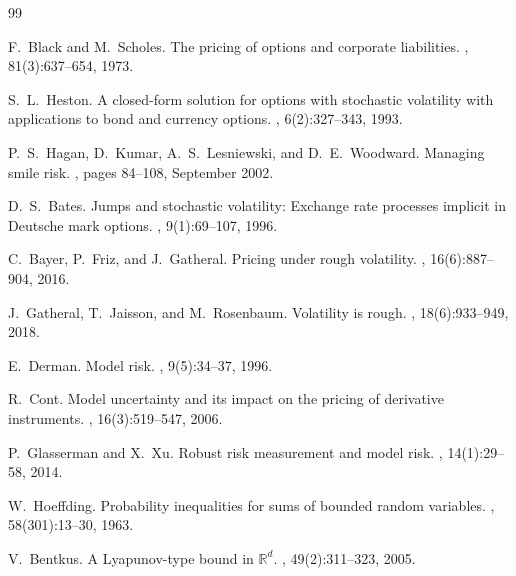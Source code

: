 \documentclass[11pt,a4paper]{article}
\theoremstyle{plain}
\theoremstyle{definition}
\theoremstyle{remark}
\newcommand{\R}{\mathbb{R}}
\begin{document}
\begin{thebibliography}{99}

F.~Black and M.~Scholes.
\newblock The pricing of options and corporate liabilities.
, 81(3):637--654, 1973.

S.~L.~Heston.
\newblock A closed-form solution for options with stochastic volatility with
  applications to bond and currency options.
, 6(2):327--343, 1993.

P.~S.~Hagan, D.~Kumar, A.~S.~Lesniewski, and D.~E.~Woodward.
\newblock Managing smile risk.
, pages 84--108, September 2002.

D.~S.~Bates.
\newblock Jumps and stochastic volatility: Exchange rate processes implicit in
  Deutsche mark options.
, 9(1):69--107, 1996.

C.~Bayer, P.~Friz, and J.~Gatheral.
\newblock Pricing under rough volatility.
, 16(6):887--904, 2016.

J.~Gatheral, T.~Jaisson, and M.~Rosenbaum.
\newblock Volatility is rough.
, 18(6):933--949, 2018.

E.~Derman.
\newblock Model risk.
, 9(5):34--37, 1996.

R.~Cont.
\newblock Model uncertainty and its impact on the pricing of derivative
  instruments.
, 16(3):519--547, 2006.

P.~Glasserman and X.~Xu.
\newblock Robust risk measurement and model risk.
, 14(1):29--58, 2014.

W.~Hoeffding.
\newblock Probability inequalities for sums of bounded random variables.
,
  58(301):13--30, 1963.

V.~Bentkus.
\newblock A Lyapunov-type bound in $\R^d$.
, 49(2):311--323,
  2005.


\end{thebibliography}
\end{document}
